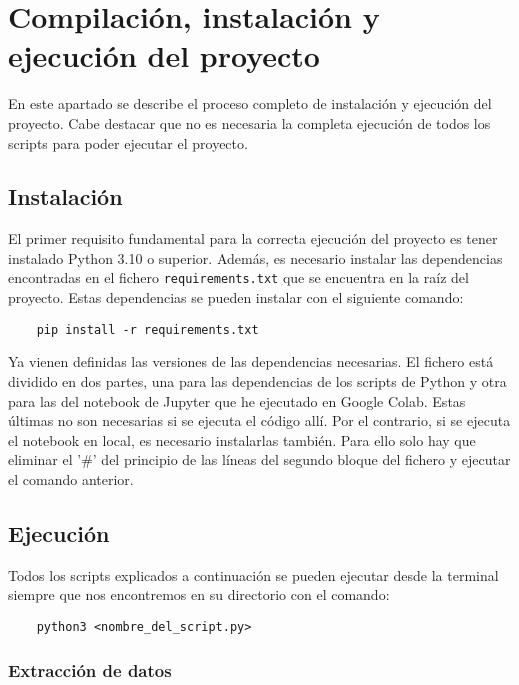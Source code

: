 \section{Compilación, instalación y ejecución del proyecto}

En este apartado se describe el proceso completo de instalación y ejecución del proyecto.
Cabe destacar que no es necesaria la completa ejecución de todos los scripts para poder ejecutar el proyecto.

\subsection{Instalación}

El primer requisito fundamental para la correcta ejecución del proyecto es tener instalado Python 3.10 o superior. 
Además, es necesario instalar las dependencias encontradas en el fichero \texttt{requirements.txt} que se encuentra en la raíz del proyecto.
Estas dependencias se pueden instalar con el siguiente comando:
    
\begin{verbatim}
    pip install -r requirements.txt
\end{verbatim}

Ya vienen definidas las versiones de las dependencias necesarias. El fichero está dividido en dos partes, una para las dependencias de los scripts de Python y otra para las del notebook de Jupyter que he ejecutado en Google Colab.
Estas últimas no son necesarias si se ejecuta el código allí. Por el contrario, si se ejecuta el notebook en local, es necesario instalarlas también. Para ello solo hay que eliminar el '\#' del principio de las líneas del segundo bloque del fichero y ejecutar el comando anterior.

\subsection{Ejecución}

Todos los scripts explicados a continuación se pueden ejecutar desde la terminal siempre que nos encontremos en su directorio con el comando:

\begin{verbatim}
    python3 <nombre_del_script.py>
\end{verbatim}

\subsubsection{Extracción de datos}

